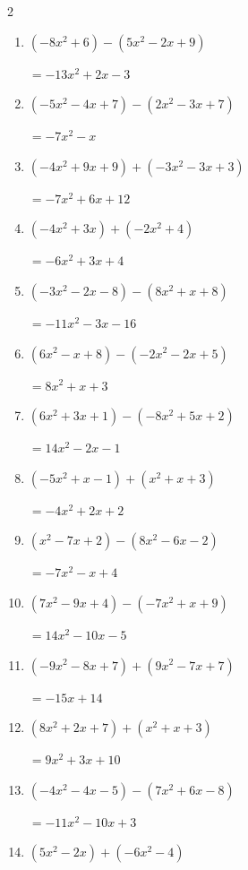 \begin{multicols}{2}
\begin{enumerate}
        $=x^{2}-4x+2$

  \item $(-8x^{2}+6)-(5x^{2}-2x+9)$

        $=-13x^{2}+2x-3$

  \item $(-5x^{2}-4x+7)-(2x^{2}-3x+7)$

        $=-7x^{2}-x$

  \item $(-4x^{2}+9x+9)+(-3x^{2}-3x+3)$

        $=-7x^{2}+6x+12$

  \item $(-4x^{2}+3x)+(-2x^{2}+4)$

        $=-6x^{2}+3x+4$

  \item $(-3x^{2}-2x-8)-(8x^{2}+x+8)$

        $=-11x^{2}-3x-16$

  \item $(6x^{2}-x+8)-(-2x^{2}-2x+5)$

        $=8x^{2}+x+3$

  \item $(6x^{2}+3x+1)-(-8x^{2}+5x+2)$

        $=14x^{2}-2x-1$

  \item $(-5x^{2}+x-1)+(x^{2}+x+3)$

        $=-4x^{2}+2x+2$

  \item $(x^{2}-7x+2)-(8x^{2}-6x-2)$

        $=-7x^{2}-x+4$

  \item $(7x^{2}-9x+4)-(-7x^{2}+x+9)$

        $=14x^{2}-10x-5$

  \item $(-9x^{2}-8x+7)+(9x^{2}-7x+7)$

        $=-15x+14$

  \item $(8x^{2}+2x+7)+(x^{2}+x+3)$

        $=9x^{2}+3x+10$

  \item $(-4x^{2}-4x-5)-(7x^{2}+6x-8)$

        $=-11x^{2}-10x+3$

\columnbreak %

  \item $(5x^{2}-2x)+(-6x^{2}-4)$


\end{enumerate}
\end{multicols}
